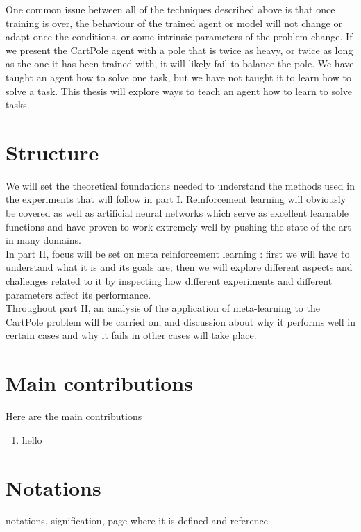 One common issue between all of the techniques described above is that once
training is over, the behaviour of the trained agent or model will not change
or adapt once the conditions, or some intrinsic parameters of the problem
change. If we present the CartPole agent with a pole that is twice as heavy,
or twice as long as the one it has been trained with, it will likely fail to 
balance the pole. We have taught an agent how to solve one task, but we have
not taught it to learn how to solve a task. This thesis will explore ways to 
teach an agent how to learn to solve tasks.



\section{Structure}
We will set the theoretical foundations needed to understand the methods used
in the experiments that will follow in part I. Reinforcement learning will
obviously be covered as well as artificial neural networks which serve as 
excellent learnable functions and have proven to work extremely well by
pushing the state of the art in many domains.\\

In part II, focus will be set on meta reinforcement learning : first we will
have to understand what it is and its goals are; then we will explore different
aspects and challenges related to it by inspecting how different experiments
and different parameters affect its performance.\\

Throughout part II, an analysis of the application of meta-learning to the
CartPole problem will be carried on, and discussion about why it performs
well in certain cases and why it fails in other cases will take place.


\section{Main contributions}
\noindent
Here are the main contributions
\vspace{1cm}
\begin{enumerate}
    \item hello
\end{enumerate}

\clearpage
\section{Notations}

%
notations, signification, page where it is defined and reference
\
